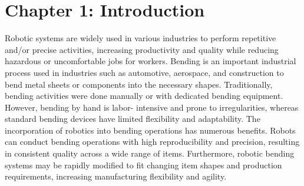 \section*{Chapter 1: Introduction}

Robotic systems are widely used in various industries to perform repetitive
and/or precise activities, increasing productivity and quality while reducing
hazardous or uncomfortable jobs for workers.
Bending is an important industrial process used in industries such as
automotive, aerospace, and construction to bend metal sheets or components
into the necessary shapes. Traditionally, bending activities were done manually
or with dedicated bending equipment. However, bending by hand is labor-
intensive and prone to irregularities, whereas standard bending devices have
limited flexibility and adaptability.
The incorporation of robotics into bending operations has numerous benefits.
Robots can conduct bending operations with high reproducibility and precision,
resulting in consistent quality across a wide range of items. Furthermore, robotic
bending systems may be rapidly modified to fit changing item shapes and
production requirements, increasing manufacturing flexibility and agility.